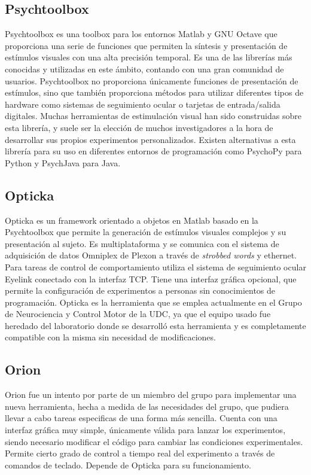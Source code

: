 \documentclass[conference]{IEEEtran}
\begin{document}
\subsection{Psychtoolbox}

Psychtoolbox\cite{psychtoolbox} es una toolbox para los entornos Matlab y GNU Octave que proporciona una serie de funciones que permiten la síntesis y presentación de estímulos visuales con una alta precisión temporal. 
Es una de las librerías más conocidas y utilizadas en este ámbito, contando con una gran comunidad de usuarios.
Psychtoolbox no proporciona únicamente funciones de presentación de estímulos, sino que también proporciona métodos para utilizar diferentes tipos de hardware como sistemas de seguimiento ocular o tarjetas de entrada/salida digitales.
Muchas herramientas de estimulación visual \cite{opticka}\cite{wave} han sido construidas sobre esta librería, y suele ser la elección de muchos investigadores a la hora de desarrollar sus propios experimentos personalizados.
Existen alternativas a esta librería para su uso en diferentes entornos de programación como PsychoPy\cite{psychopy} para Python y PsychJava para Java.


\subsection{Opticka}

Opticka\cite{opticka} es un framework orientado a objetos en Matlab basado en la Psychtoolbox que permite la generación de estímulos visuales complejos y su presentación al sujeto. Es multiplataforma y se comunica con el sistema de adquisición de datos Omniplex\cite{omniplex} de Plexon a través de \textit{strobbed words} y ethernet. Para tareas de control de comportamiento utiliza el sistema de seguimiento ocular Eyelink conectado con la interfaz TCP. 
Tiene una interfaz gráfica opcional, que permite la configuración de experimentos a personas sin conocimientos de programación.
Opticka es la herramienta que se emplea actualmente en el Grupo de Neurociencia y Control Motor de la UDC, ya que el equipo usado fue heredado del laboratorio donde se desarrolló esta herramienta y es completamente compatible con la misma sin necesidad de modificaciones.



\subsection{Orion}

Orion fue un intento por parte de un miembro del grupo para implementar una nueva herramienta, hecha a medida de las necesidades del grupo, que pudiera llevar a cabo tareas especificas de una forma más sencilla. Cuenta con una interfaz gráfica muy simple, únicamente válida para lanzar los experimentos, siendo necesario modificar el código para cambiar las condiciones experimentales. Permite cierto grado de control a tiempo real del experimento a través de comandos de teclado.
Depende de Opticka para su funcionamiento.
\end{document}
